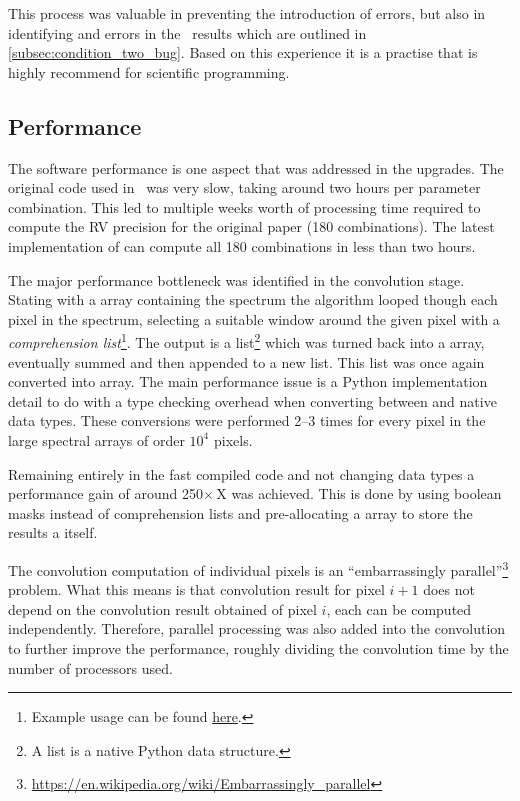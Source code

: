This process was valuable in preventing the introduction of errors, but also in identifying and errors in the~\citep{figueira_radial_2016} results which are outlined in \cref{subsec:condition_two_bug}.
Based on this experience it is a practise that is highly recommend for scientific programming.


\subsection{Performance}
\label{subsec:code_performance}
The software performance is one aspect that was addressed in the upgrades.
The original code used in~\citet{figueira_radial_2016} was very slow, taking around two hours per parameter combination.
This led to multiple weeks worth of processing time required to compute the {RV} precision for the original paper (180 combinations).
The latest implementation of \eniric{} can compute all 180 combinations in less than two hours.

The major performance bottleneck was identified in the convolution stage.
Stating with a \numpy{} array containing the spectrum the algorithm looped though each pixel in the spectrum, selecting a suitable window around the given pixel with a \emph{comprehension list}\footnote{Example usage can be found \href{https://docs.python.org/3/tutorial/datastructures.html\#list-comprehensions}{here}.}.
The output is a list\footnote{A list is a native Python data structure.} which was turned back into a \numpy{} array, eventually summed and then appended to a new list.
This list was once again converted into \numpy{} array.
The main performance issue is a Python implementation detail to do with a type checking overhead when converting between \numpy{} and native data types.
These conversions were performed 2--3 times for every pixel in the large spectral arrays of order \({10}^{4}\) pixels.

Remaining entirely in the fast compiled \numpy{} code and not changing data types a performance gain of around 250\(\times\)\,X was achieved.
This is done by using boolean masks instead of comprehension lists and pre-allocating a \numpy{} array to store the results a itself.

The convolution computation of individual pixels is an ``embarrassingly parallel''\footnote{\href{https://en.wikipedia.org/wiki/Embarrassingly\_parallel}{https://en.wikipedia.org/wiki/Embarrassingly\_parallel}} problem.
What this means is that convolution result for pixel $i+1$ does not depend on the convolution result obtained of pixel $i$, each can be computed independently.
Therefore, parallel processing was also added into the convolution to further improve the performance, roughly dividing the convolution time by the number of processors used.

